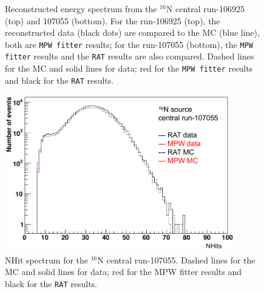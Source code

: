 \begin{figure}[htbp]
	\centering
	\caption[Reconstructed energy spectrum from the $^{16}$N central run-106925 and 107055.]{Reconstructed energy spectrum from the $^{16}$N central run-106925 (top) and 107055 (bottom). For the run-106925 (top), the reconstructed data (black dots) are compared to the MC (blue line), both are \texttt{MPW fitter} results; for the run-107055 (bottom), the \texttt{MPW fitter} results and the \texttt{RAT} results are also compared. Dashed lines for the MC and solid lines for data; red for the \texttt{MPW fitter} results and black for the \texttt{RAT} results.}
	\label{fig:N16energy}	
\end{figure}

\begin{figure}[htbp]
	\centering
	\includegraphics[width=10cm]{N16_nhits_107055.png}
	\caption[NHit spectrum for the $^{16}$N central run-107055.]{NHit spectrum for the $^{16}$N central run-107055. Dashed lines for the MC and solid lines for data; red for the MPW fitter results and black for the \texttt{RAT} results.}
	\label{N16nhits}
\end{figure}

